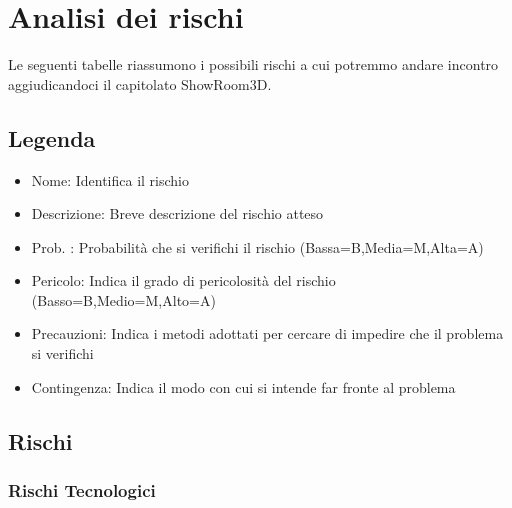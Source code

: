 \section{Analisi dei rischi}
Le seguenti tabelle riassumono i possibili rischi a cui potremmo andare incontro aggiudicandoci il capitolato ShowRoom3D.
\subsection{Legenda}
\begin{itemize}
    \item Nome: Identifica il rischio
    \item Descrizione: Breve descrizione del rischio atteso 
    \item Prob. : Probabilità che si verifichi il rischio (Bassa=B,Media=M,Alta=A)
    \item Pericolo: Indica il grado di pericolosità del rischio (Basso=B,Medio=M,Alto=A)
    \item Precauzioni: Indica i metodi adottati per cercare di impedire che il problema si verifichi
    \item Contingenza: Indica il modo con cui si intende far fronte al problema 
\end{itemize}   

\subsection{Rischi}
\subsubsection{Rischi Tecnologici}

